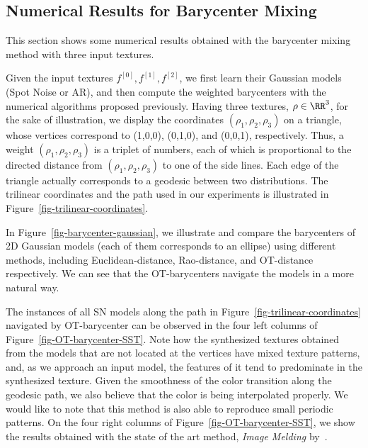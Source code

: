 
\subsection{Numerical Results for Barycenter Mixing}

This section shows some numerical results obtained with the barycenter mixing method with three input textures.

Given the input textures $f^{[0]},f^{[1]},f^{[2]}$, we first learn their Gaussian models (Spot Noise or AR), and then compute the weighted barycenters with the numerical algorithms proposed previously.
Having three textures, $\rho \in \RR^3$, for the sake of illustration, we display the coordinates $(\rho_1, \rho_2, \rho_3)$ on a triangle, whose vertices correspond to (1,0,0), (0,1,0), and (0,0,1), respectively. Thus, a weight $(\rho_1, \rho_2, \rho_3)$ is a triplet of numbers, each of which is proportional to the directed distance from $(\rho_1, \rho_2, \rho_3)$ to one of the side lines. Each edge of the triangle actually corresponds to a geodesic between two distributions. The trilinear coordinates and the path used in our experiments is illustrated in Figure~\ref{fig-trilinear-coordinates}.

In Figure~\ref{fig-barycenter-gaussian}, we illustrate and compare the barycenters of 2D Gaussian models (each of them corresponds to an ellipse) using different methods, including Euclidean-distance, Rao-distance, and OT-distance respectively.
We can see that the OT-barycenters navigate the models in a more natural way.

The instances of all SN models along the path in Figure~\ref{fig-trilinear-coordinates} navigated by OT-barycenter can be observed in the four left columns of Figure~\ref{fig-OT-barycenter-SST}. Note how the synthesized textures obtained from the models that are not located at the vertices have mixed texture patterns, and, as we approach an input model, the features of it tend to predominate in the synthesized texture. Given the smoothness of the color transition along the geodesic path, we also believe that the color is being interpolated properly. We would like to note that  this method is also able to reproduce small periodic patterns.
On the four right columns of Figure~\ref{fig-OT-barycenter-SST}, we show the results obtained with the state of the art method, \emph{Image Melding} by~\cite{ImageMelding12}.

